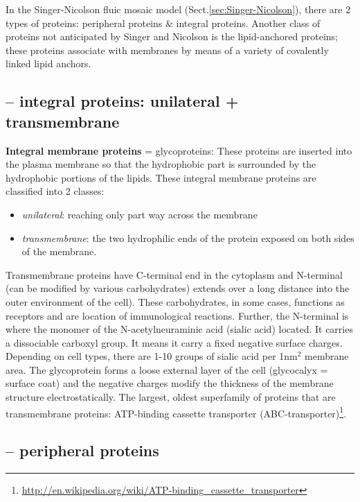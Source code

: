 In the Singer-Nicolson fluic mosaic model (Sect.\ref{sec:Singer-Nicolson}),
there are 2 types of proteins: peripheral proteins \& integral proteins. Another
class of proteins not anticipated by Singer and Nicolson is the lipid-anchored
proteins; these proteins associate with membranes by means of a variety of
covalently linked lipid anchors.

\subsection{-- integral proteins: unilateral + transmembrane}
\label{sec:transm-prot}
\label{sec:integral-proteins}

{\bf Integral membrane proteins} = glycoproteins: These proteins are
inserted into the plasma membrane so that the hydrophobic part is
surrounded by the hydrophobic portions of the lipids. These integral
membrane proteins are classified into 2 classes:
\begin{itemize}
\item {\it unilateral}: reaching only part way across the membrane

\item {\it transmembrane}: the two hydrophilic ends of the protein
  exposed on both sides of the membrane.
\end{itemize}


Transmembrane proteins have C-terminal end in the cytoplasm and
N-terminal (can be modified by various carbohydrates) extends over a
long distance into the outer environment of the cell).  These
carbohydrates, in some cases, functions as receptors and are location
of immunological reactions. Further, the N-terminal is where the
monomer of the N-acetylneuraminic acid (sialic acid) located. It
carries a dissociable carboxyl group. It means it carry a fixed
negative surface charges. Depending on cell types, there are 1-10
groups of sialic acid per 1nm$^2$ membrane area.  The glycoprotein
forms a loose external layer of the cell (glycocalyx = surface coat)
and the negative charges modify the thickness of the membrane
structure electrostatically.  The largest, oldest superfamily of
proteins that are transmembrane proteins: ATP-binding cassette
transporter
(ABC-transporter)\footnote{\url{http://en.wikipedia.org/wiki/ATP-binding\_cassette\_transporter}}.


\subsection{-- peripheral proteins}
\label{sec:peripheral-proteins}


